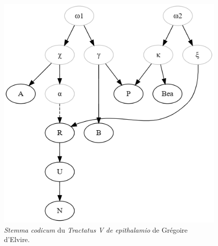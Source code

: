 \documentclass[a4paper,twoside,12pt]{book}
\begin{document}
\begin{figure}[p]  
	\centering
	\includegraphics[width=0.8\linewidth]{img/stemmagregorius.png}
	\caption{\textit{Stemma codicum} du \textit{Tractatus V de epithalamio} de Grégoire d'Elvire.}
	\label{fig:stemma1}
\end{figure}
\end{document}
